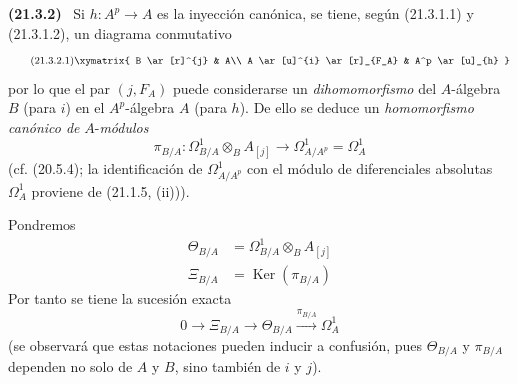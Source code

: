 \documentclass[10pt,oneside]{book}
\makeatletter
\newcommand{\setmanualcurrentlabel}[1]{\def\@currentlabel{#1}}
\newcommand{\oldpage}[2][]{%
  \setcounter{footnote}{0}%
  \marginpar{\scriptsize\textbf{#1}~|~#2}\ignorespaces}
\newenvironment{env}[1][]{\setmanualcurrentlabel{#1}\par\medskip\noindent\textbf{(#1)}\ }{\par}
\makeatother
\begin{document}
\begin{env}[21.3.2]
\label{0.21.3.2-es}
Si $h:A^p\to A$ es la inyección canónica, se tiene, según (21.3.1.1) y
(21.3.1.2), un diagrama conmutativo
\begin{equation}
\tag{21.3.2.1}\label{0.21.3.2.1-es}
\xymatrix{
 B \ar[r]^{j} & A\\
 A \ar[u]^{i} \ar[r]_{F_A} & A^p \ar[u]_{h}
}
\end{equation}
por lo que el par $(j,F_A)$ puede considerarse un \emph{dihomomorfismo} del
$A$-álgebra $B$ (para $i$) en el $A^p$-álgebra $A$ (para $h$).
De ello se deduce un \emph{homomorfismo canónico de} $A$-\emph{módulos}
\begin{equation}
\tag{21.3.2.2}\label{0.21.3.2.2-es}
\pi_{B/A}:\Omega^1_{B/A}\otimes_B A_{[j]}\longrightarrow
\Omega^1_{A/A^p}=\Omega^1_A
\end{equation}
(cf. (20.5.4); la identificación de $\Omega^1_{A/A^p}$ con el módulo de
diferenciales absolutas $\Omega^1_A$ proviene de (21.1.5, (ii))).

Pondremos
\begin{align}
\tag{21.3.2.3}\label{0.21.3.2.3-es}
\Theta_{B/A}&=\Omega^1_{B/A}\otimes_B A_{[j]}\\
\tag{21.3.2.4}\label{0.21.3.2.4-es}
\Xi_{B/A}&=\operatorname{Ker}(\pi_{B/A})
\end{align}
\oldpage[0\textsubscript{IV-1}]{161}
Por tanto se tiene la sucesión exacta
\begin{equation}
\tag{21.3.2.5}\label{0.21.3.2.5-es}
0\to\Xi_{B/A}\to\Theta_{B/A}\xrightarrow{\pi_{B/A}}\Omega^1_A
\end{equation}
(se observará que estas notaciones pueden inducir a confusión, pues
$\Theta_{B/A}$ y $\pi_{B/A}$ dependen no solo de $A$ y $B$, sino también de
$i$ y $j$).
\end{env}
\end{document}
